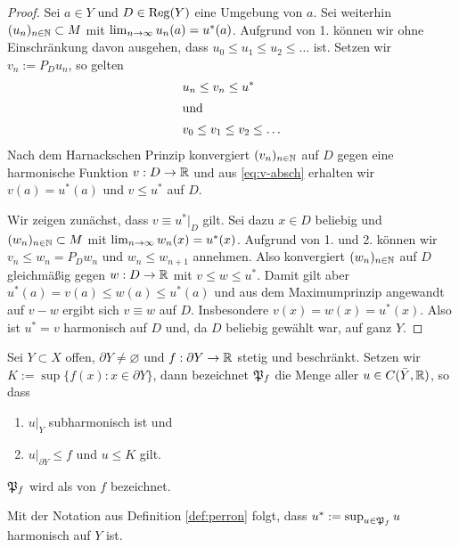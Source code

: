 \begin{proof}
  Sei $a \in Y$ und $D \in \operatorname{Reg}(Y)$ eine Umgebung von $a$. Sei
  weiterhin $(u_n)_{n \in \mathbb{N}} \subset M$ mit $\lim_{n \rightarrow \infty}
  u_n(a) = u^\ast(a)$. Aufgrund von 1. können wir ohne Einschränkung davon ausgehen, dass
  $u_0 \leq u_1 \leq u_2 \leq \dots$ ist. Setzen wir $v_n := P_D u_n$, so gelten
  \begin{align}
    & u_n \leq v_n \leq u^\ast \label{eq:v-absch} \\
    \intertext{und}
   & v_0 \leq v_1 \leq v_2 \leq \dots \nonumber
  \end{align}
  Nach dem Harnackschen Prinzip konvergiert $(v_n)_{n \in \mathbb{N}}$ auf $D$
  gegen eine harmonische Funktion $v: D \rightarrow \mathbb{R}$ und aus
  \eqref{eq:v-absch} erhalten wir $v(a) = u^\ast(a)$ und $v \leq
  u^\ast$ auf $D$.
  
  Wir zeigen zunächst, dass $v \equiv u^\ast|_D$ gilt. Sei dazu $x \in
  D$ beliebig und $(w_n)_{n\in \mathbb{N}}\subset M$ mit
  $\lim_{n \rightarrow \infty}w_n(x) = u^\ast(x)$. Aufgrund von 1. und
  2. können wir $v_n \leq w_n = P_D w_n$ und $w_n
  \leq w_{n+1}$ annehmen. Also konvergiert $(w_n)_{n \in \mathbb{N}}$ auf $D$
  gleichmäßig gegen $w: D \rightarrow \mathbb{R}$ mit $v \leq w \leq u^\ast$. Damit
  gilt aber $u^\ast(a) = v(a) \leq w(a) \leq u^\ast(a)$ und aus
  dem Maximumprinzip angewandt auf $v-w$ ergibt sich $v \equiv w$ auf
  $D$. Insbesondere $v(x) = w(x) = u^\ast(x)$. Also ist $u^\ast = v$
  harmonisch auf $D$ und, da $D$ beliebig gewählt
  war, auf ganz $Y$.
\end{proof}

\begin{defin}
  \label{def:perron}
  Sei $Y \subset X$ offen, $\partial Y \neq \varnothing$ und
  $f: \partial Y \rightarrow \mathbb{R}$ stetig und beschränkt. Setzen wir $K :=
  \sup\{f(x) : x \in \partial Y\}$, dann bezeichnet
  $\mathfrak{P}_f$ die Menge aller $u \in C(\bar Y, \mathbb{R})$, so dass
  \begin{enumerate}
  \item $u|_Y$ subharmonisch ist und
  \item $u|_{\partial Y} \leq f$ und $u \leq K$ gilt.
  \end{enumerate}
  $\mathfrak{P}_f$ wird als  von $f$ bezeichnet.
\end{defin}

\begin{cor}
  Mit der Notation aus Definition \ref{def:perron} folgt, dass $u^\ast := \sup_{u
    \in \mathfrak{P}_f} u$ harmonisch auf $Y$ ist.
\end{cor}

